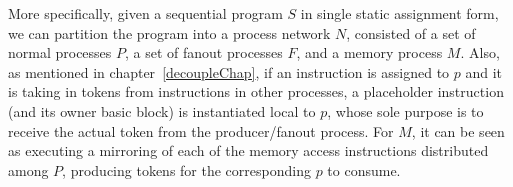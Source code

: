 More specifically, given a sequential program $S$ in single static assignment form, we can partition the program into a process network $N$, consisted of a set of normal processes $P$, a set of fanout processes $F$, and a memory process $M$. 
Also, as mentioned in chapter~\ref{decoupleChap}, if an instruction is assigned to
$p$ and it is taking in tokens from instructions in other processes, a placeholder
instruction (and its owner basic block) is instantiated local to $p$, whose sole purpose is to receive
the actual token from the producer/fanout process. For $M$, it can be seen as executing a mirroring of each of the memory access
instructions distributed among $P$, producing tokens for the corresponding $p$ to consume.


